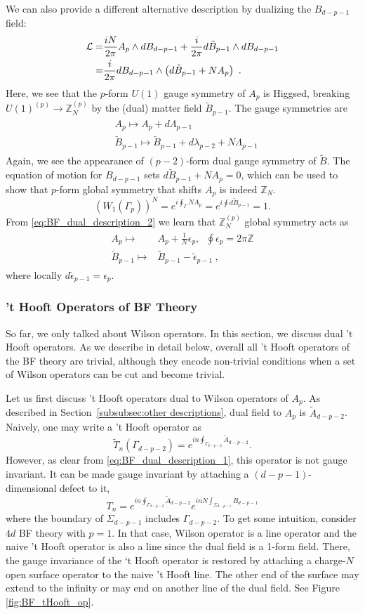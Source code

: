 \documentclass[11pt]{article}
\newcommand{\eq}[1]{\begin{align}\begin{split}#1\end{split}\end{align}}
\def\CL {{\cal L}}
\def\IZ{{\mathbb{Z}}}
\def\beq{\begin{equation}}
\def\eeq{\end{equation}}
\begin{document}
We can also provide a different alternative description by  dualizing the  $B_{d-p-1}$ field:
%
\eq{
\CL =& \frac{iN}{2\pi} A_p \wedge d B_{d-p-1} + \frac{i}{2\pi} d \tilde{B}_{p-1} \wedge d B_{d-p-1} \\
=& \frac{i}{2\pi} d B_{d-p-1}  \wedge \left( d \tilde{B}_{p-1} + N A_p \right)~.
\label{eq:BF_dual_description_2}
}
% 
Here, we see that the $p$-form $U(1)$ gauge symmetry of $A_p$ is Higgsed, breaking $U(1)^{(p)}\to \IZ_N^{(p)}$ by the (dual) matter field $\tilde{B}_{p-1}$. The gauge symmetries are
%
\eq{
& A_p \mapsto A_p + d \Lambda_{p-1} \\
& \tilde{B}_{p-1} \mapsto \tilde{B}_{p-1} + d \lambda_{p-2} + N \Lambda_{p-1} 
}
%
Again, we see the appearance of $(p-2)$-form dual gauge symmetry of $\tilde{B}$. 
The equation of motion for $ B_{d-p-1}$ sets $d \tilde{B}_{p-1} + N A_p = 0$, which can be used to show that $p$-form global symmetry that shifts $A_p$ is indeed $\IZ_N$.
%
\beq
\left( W_1 (\Gamma_p) \right)^N = e^{i \oint_\Gamma N A_p} = e^{i \oint d \tilde{B}_{p-1}} = 1.
\eeq
%
From \eqref{eq:BF_dual_description_2} we learn that $\IZ_N^{(p)}$ global symmetry acts as
%
\eq{
 A_p \longmapsto &A_p + \frac{1}{N} \epsilon_p, \;\; \oint \epsilon_p = 2\pi \IZ \\
 \tilde{B}_{p-1} \longmapsto &\tilde{B}_{p-1} - \tilde{\epsilon}_{p-1}~,
}
%
where locally $d \tilde{\epsilon}_{p-1} = \epsilon_p$.




\subsubsection{'t Hooft Operators of BF Theory}

So far, we only talked about Wilson operators. In this section, we discuss dual 't Hooft operators. As we describe in detail below, overall all 't Hooft operators of the BF theory are trivial, although they encode non-trivial conditions when a set of Wilson operators can be cut and become trivial. 

Let us first discuss 't Hooft operators dual to Wilson operators of $A_p$. As described in Section~\ref{subsubsec:other descriptions}, dual field to $A_p$ is $\tilde{A}_{d-p-2}$. Naively, one may write a 't Hooft operator as
%
\beq
\tilde{T}_n (\Gamma_{d-p-2}) = e^{i n \oint_{\Gamma_{d-p-2}} \tilde{A}_{d-p-2}}.
\eeq
%
However, as clear from \eqref{eq:BF_dual_description_1}, this operator is not gauge invariant. It can be made gauge invariant by attaching a $(d-p-1)$-dimensional defect to it,
%
\beq
T_n  = e^{i n \oint_{\Gamma_{d-p-2}} \tilde{A}_{d-p-2}} e^{i n N \int_{\Sigma_{d-p-1}} B_{d-p-1}}
\label{eq:BF_tHooft_op_1}
\eeq
%
where the boundary of $\Sigma_{d-p-1}$ includes $\Gamma_{d-p-2}$.
To get some intuition, consider $4d$ BF theory with $p=1$. In that case, Wilson operator is a line operator and the naive 't Hooft operator is also a line since the dual field is a 1-form field. There, the gauge invariance of the `t Hooft operator is restored by attaching a charge-$N$ open surface operator to the naive 't Hooft line. The other end of the surface may extend to the infinity or may end on another line of the dual field. See Figure \ref{fig:BF_tHooft_op}. 
 
\end{document}
